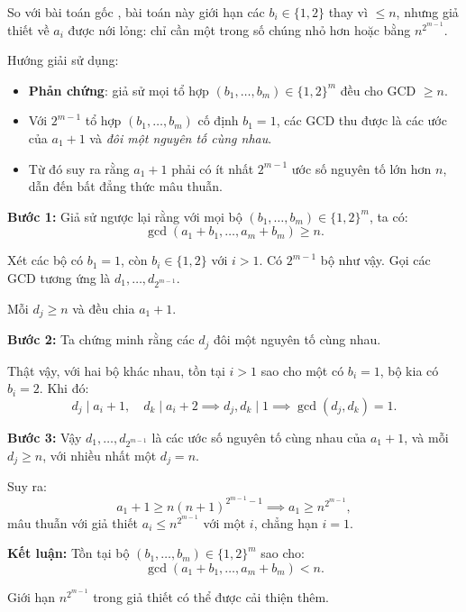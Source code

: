 \documentclass[../01-divisibility.tex]{subfiles}
\begin{document}
\begin{story*}
	So với bài toán gốc , bài toán này giới hạn các \( b_i \in \{1, 2\} \) thay vì \( \leq n \),
	nhưng giả thiết về \( a_i \) được nới lỏng: chỉ cần một trong số chúng nhỏ hơn hoặc bằng \( n^{2^{m-1}} \).

	Hướng giải sử dụng:
	\begin{itemize}[topsep=0pt, partopsep=0pt, itemsep=0pt]
		\item \textbf{Phản chứng}: giả sử mọi tổ hợp \( (b_1, \dots, b_m) \in \{1,2\}^m \) đều cho GCD \( \geq n \).
		\item Với \( 2^{m-1} \) tổ hợp \( (b_1, \dots, b_m) \) cố định \( b_1 = 1 \), các GCD thu được là các ước của \( a_1 + 1 \) và \textit{đôi một nguyên tố cùng nhau}.
		\item Từ đó suy ra rằng \( a_1 + 1 \) phải có ít nhất \( 2^{m-1} \) ước số nguyên tố lớn hơn \( n \), dẫn đến bất đẳng thức mâu thuẫn.
	\end{itemize}
\end{story*}

\bigbreak

\begin{soln}\footnotemark
	\textbf{Bước 1:} Giả sử ngược lại rằng với mọi bộ \( (b_1, \dots, b_m) \in \{1, 2\}^m \), ta có:
	\[
		\gcd(a_1 + b_1, \dots, a_m + b_m) \geq n.
	\]

	Xét các bộ có \( b_1 = 1 \), còn \( b_i \in \{1, 2\} \) với \( i > 1 \). Có \( 2^{m-1} \) bộ như vậy. Gọi các GCD tương ứng là \( d_1, \dots, d_{2^{m-1}} \).

	Mỗi \( d_j \geq n \) và đều chia \( a_1 + 1 \).

	\textbf{Bước 2:} Ta chứng minh rằng các \( d_j \) đôi một nguyên tố cùng nhau.

	Thật vậy, với hai bộ khác nhau, tồn tại \( i > 1 \) sao cho một có \( b_i = 1 \), bộ kia có \( b_i = 2 \). Khi đó:
	\[
		d_j \mid a_i + 1,\quad d_k \mid a_i + 2 \implies d_j, d_k \mid 1 \implies \gcd(d_j, d_k) = 1.
	\]

	\textbf{Bước 3:} Vậy \( d_1, \dots, d_{2^{m-1}} \) là các ước số nguyên tố cùng nhau của \( a_1 + 1 \), và mỗi \( d_j \geq n \), với nhiều nhất một \( d_j = n \). 

	Suy ra:
	\[
		a_1 + 1 \geq n(n+1)^{2^{m-1} - 1} \implies a_1 \geq n^{2^{m-1}},
	\]
	mâu thuẫn với giả thiết \( a_i \leq n^{2^{m-1}} \) với một \( i \), chẳng hạn \( i = 1 \).

	\textbf{Kết luận:} Tồn tại bộ \( (b_1, \dots, b_m) \in \{1, 2\}^m \) sao cho:
	\[
		\gcd(a_1 + b_1, \dots, a_m + b_m) < n.
	\]
\end{soln}

\begin{remark*}
	Giới hạn \( n^{2^{m-1}} \) trong giả thiết có thể được cải thiện thêm.
\end{remark*}

\end{document}
